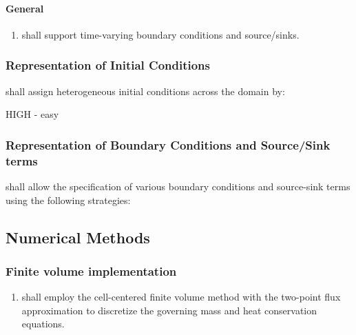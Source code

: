 \paragraph{General}
\begin{enumerate}[resume]
    \item \label{FRvaryTime} \pft shall support time-varying boundary conditions and source/sinks.
\end{enumerate}

\subsubsection{Representation of Initial Conditions}
\pft shall assign heterogeneous initial conditions across the domain by:
\begin{enumerate}
	\assignbyregion \label{repICRegions}
	\assignbycoordinate \label{repICLocation}
	\assignbycellid \label{repICCellID}
\end{enumerate}
HIGH - easy

\subsubsection{Representation of Boundary Conditions and Source/Sink terms}
\pft shall allow the specification of various boundary conditions and source-sink terms using the following strategies:
\begin{enumerate}
	\assignbyregion \label{repBCRegions}
	\assignbycoordinate \label{repBCLocation}
\end{enumerate}

\subsection{Numerical Methods}

\subsubsection{Finite volume implementation}
\begin{enumerate}
	\item \label{FVmethod} \pft shall employ the cell-centered finite volume method with the two-point flux approximation to discretize the governing mass and heat conservation equations.
\end{enumerate}

